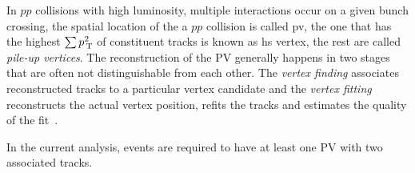 In $pp$ collisions with high luminosity, multiple interactions occur on a given
bunch crossing, the spatial location of the a $pp$ collision is called \gls{pv},
the one that has the highest $\sum p_\mathrm{\, T}^2$ of constituent tracks is known as
\gls{hs} vertex, the rest are called \emph{pile-up vertices}. The
reconstruction of the PV generally happens in two stages that are often not
distinguishable from each other. The \emph{vertex finding} associates
reconstructed tracks to a particular vertex candidate and the \emph{vertex
  fitting} reconstructs the actual vertex position, refits the tracks and
estimates the quality of the fit~\cite{PV}.

In the current analysis, events are required to have at least one PV with two
associated tracks.
